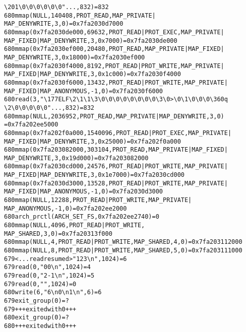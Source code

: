\documentclass[pdf, unicode, 12pt, a4paper,oneside,fleqn]{article}
\begin{document}
\begin{alltt}
\textbackslash201\textbackslash0\textbackslash0\textbackslash0\textbackslash0\textbackslash0\textbackslash0"..., 832) = 832
680   mmap(NULL, 140408, PROT_READ, MAP_PRIVATE|
MAP_DENYWRITE, 3, 0) = 0x7fa2030d7000
680   mmap(0x7fa2030de000, 69632, PROT_READ|PROT_EXEC, MAP_PRIVATE|
MAP_FIXED|MAP_DENYWRITE, 3, 0x7000) = 0x7fa2030de000
680   mmap(0x7fa2030ef000, 20480, PROT_READ, MAP_PRIVATE|MAP_FIXED|
MAP_DENYWRITE, 3, 0x18000) = 0x7fa2030ef000
680   mmap(0x7fa2030f4000, 8192, PROT_READ|PROT_WRITE, MAP_PRIVATE|
MAP_FIXED|MAP_DENYWRITE, 3, 0x1c000) = 0x7fa2030f4000
680   mmap(0x7fa2030f6000, 13432, PROT_READ|PROT_WRITE, MAP_PRIVATE|
MAP_FIXED|MAP_ANONYMOUS, -1, 0) = 0x7fa2030f6000
680   read(3, "\textbackslash177ELF\textbackslash2\textbackslash1\textbackslash1\textbackslash3\textbackslash0\textbackslash0\textbackslash0\textbackslash0\textbackslash0\textbackslash0\textbackslash0\textbackslash0\textbackslash3\textbackslash0>\textbackslash0\textbackslash1\textbackslash0\textbackslash0\textbackslash0\textbackslash360q
\textbackslash2\textbackslash0\textbackslash0\textbackslash0\textbackslash0\textbackslash0"..., 832) = 832
680   mmap(NULL, 2036952, PROT_READ, MAP_PRIVATE|MAP_DENYWRITE, 3, 0)
    = 0x7fa202ee5000
680   mmap(0x7fa202f0a000, 1540096, PROT_READ|PROT_EXEC, MAP_PRIVATE|
MAP_FIXED|MAP_DENYWRITE, 3, 0x25000) = 0x7fa202f0a000
680   mmap(0x7fa203082000, 303104, PROT_READ, MAP_PRIVATE|MAP_FIXED|
MAP_DENYWRITE, 3, 0x19d000) = 0x7fa203082000
680   mmap(0x7fa2030cd000, 24576, PROT_READ|PROT_WRITE, MAP_PRIVATE|
MAP_FIXED|MAP_DENYWRITE, 3, 0x1e7000) = 0x7fa2030cd000
680   mmap(0x7fa2030d3000, 13528, PROT_READ|PROT_WRITE, MAP_PRIVATE|
MAP_FIXED|MAP_ANONYMOUS, -1, 0) = 0x7fa2030d3000
680   mmap(NULL, 12288, PROT_READ|PROT_WRITE, MAP_PRIVATE|
MAP_ANONYMOUS, -1, 0) = 0x7fa202ee2000
680   arch_prctl(ARCH_SET_FS, 0x7fa202ee2740) = 0
680   mmap(NULL, 4096, PROT_READ|PROT_WRITE, 
MAP_SHARED, 3, 0) = 0x7fa20313f000
680   mmap(NULL, 4, PROT_READ|PROT_WRITE, MAP_SHARED, 4, 0) = 0x7fa203112000
680   mmap(NULL, 8, PROT_READ|PROT_WRITE, MAP_SHARED, 5, 0) = 0x7fa203111000
679   <... read resumed>"1 2 3\textbackslash{n}", 1024) = 6
679   read(0, "0 0\textbackslash{n}", 1024)            = 4
679   read(0, "2 -1\textbackslash{n}", 1024)           = 5
679   read(0, "", 1024)                 = 0
680   write(6, "6\textbackslash{n}0\textbackslash{n}1\textbackslash{n}", 6)          = 6
679   exit_group(0)                     = ?
679   +++ exited with 0 +++
680   exit_group(0)                     = ?
680   +++ exited with 0 +++
\end{alltt}
\end{document}
